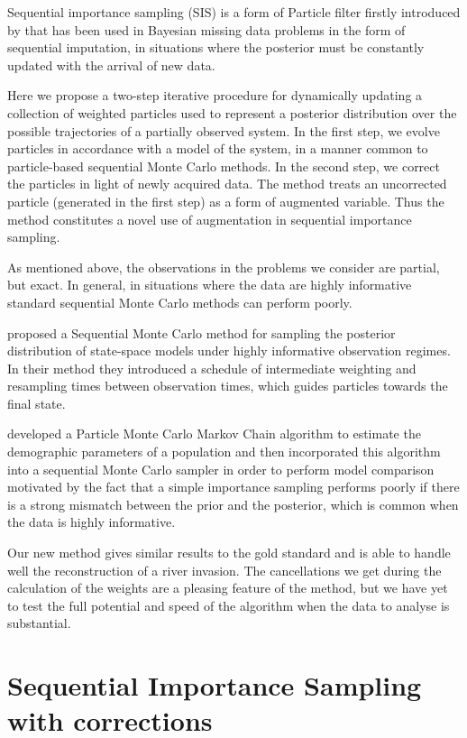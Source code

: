 Sequential importance sampling (SIS) is a form of Particle filter firstly introduced by \cite{Kong} that has been used in Bayesian missing data problems in the form of sequential imputation, in situations where the posterior must be constantly updated with the arrival of new data.

Here we propose a two-step iterative procedure for dynamically updating a collection of weighted particles used to represent a posterior distribution over the possible trajectories of a partially observed system. In the first step, we evolve particles in accordance with a model of the system, in a manner common to particle-based sequential Monte Carlo methods. In the second step, we correct the particles in light of newly acquired data. The method treats an uncorrected particle (generated in the first step) as a form of augmented variable. Thus the method constitutes a novel use of augmentation in sequential importance sampling. 

As mentioned above, the observations in the problems we consider are partial, but exact. In general, in situations where the data are highly informative standard sequential Monte Carlo methods can perform poorly. 

\cite{Del Moral} proposed a Sequential Monte Carlo method for sampling the posterior distribution of state-space models under highly informative observation regimes. In their method they introduced a schedule of intermediate weighting and resampling times between observation times, which guides particles towards the final state.

\cite{Finke} developed a Particle Monte Carlo Markov Chain algorithm to estimate the demographic parameters of a population and then incorporated this algorithm into a sequential Monte Carlo sampler in order to perform model comparison motivated by the fact that a simple importance sampling performs poorly if there is a strong mismatch between the prior and the posterior, which is common when the data is highly informative.

Our new method gives similar results to the gold standard and is able to handle well the reconstruction of a river invasion. The cancellations we get during the calculation of the weights are a pleasing feature of the method, but we have yet to test the full potential and speed of the algorithm when the data to analyse is substantial.

\section{Sequential Importance Sampling with corrections}
\label{sec:2}

